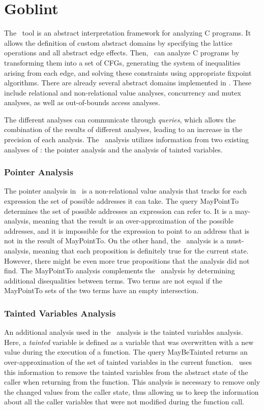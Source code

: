 \section{Goblint}\label{section:goblint}

The \goblint\ tool is an abstract interpretation framework for analyzing C programs.
It allows the definition of custom abstract domains by specifying the lattice operations and all abstract edge effects.
Then, \goblint\ can analyze C programs by transforming them into a set of CFGs, generating the system of inequalities arising from each edge, and solving these constraints using appropriate fixpoint algorithms.
There are already several abstract domains implemented in \goblint. These include relational and non-relational value analyses, concurrency and mutex analyses, as well as out-of-bounds access analyses.

The different analyses can communicate through \emph{queries}, which allows the combination of the results of different analyses, leading to an increase in the precision of each analysis.
The \cpo\ analysis utilizes information from two existing analyses of \goblint: the pointer analysis and the analysis of tainted variables.

\subsubsection{Pointer Analysis}

The pointer analysis in \goblint\ is a non-relational value analysis that tracks for each expression the set of possible addresses it can take.
The query \textsf{MayPointTo} determines the set of possible addresses an expression can refer to.
It is a may-analysis, meaning that the result is an over-approximation of the possible addresses, and it is impossible for the expression to point to an address that is not in the result of \textsf{MayPointTo}.
On the other hand, the \cpo\ analysis is a must-analysis, meaning that each proposition is definitely true for the current state. However, there might be even more true propositions that the analysis did not find.
The \textsf{MayPointTo} analysis complements the \cpo\ analysis by determining additional disequalities between terms.
Two terms are not equal if the \textsf{MayPointTo} sets of the two terms have an empty intersection.

\subsubsection{Tainted Variables Analysis}

An additional analysis used in the \cpo\ analysis is the tainted variables analysis.
Here, a \emph{tainted} variable is defined as a variable that was overwritten with a new value during the execution of a function.
The query \textsf{MayBeTainted} returns an over-approximation of the set of tainted variables in the current function.
\cpo\ uses this information to remove the tainted variables from the abstract state of the caller when returning from the function.
This analysis is necessary to remove only the changed values from the caller state, thus allowing us to keep the information about all the caller variables that were not modified during the function call.
